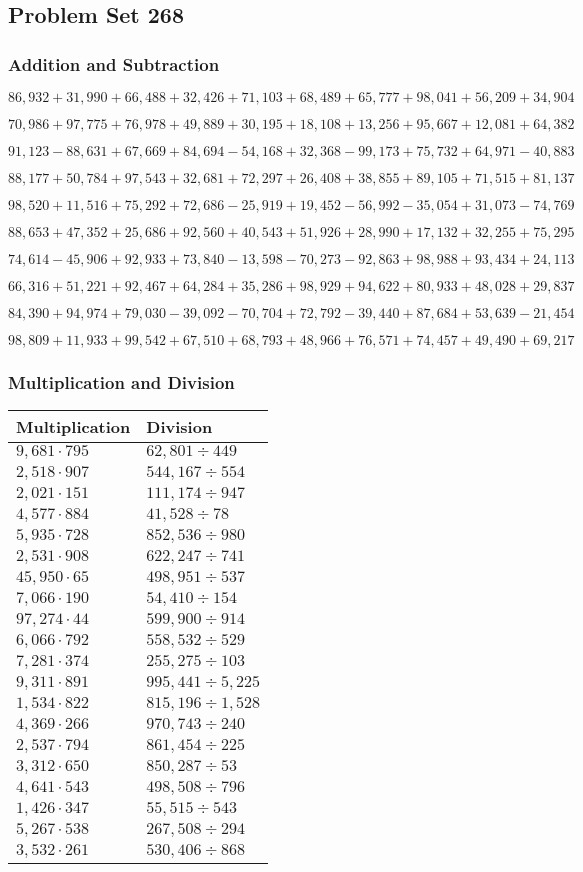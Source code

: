 \hypertarget{problem-set-268}{%
\subsection{Problem Set 268}\label{problem-set-268}}

\hypertarget{addition-and-subtraction}{%
\subsubsection{Addition and
Subtraction}\label{addition-and-subtraction}}

\(86,932+31,990+66,488+32,426+71,103+68,489+65,777+98,041+56,209+34,904\)

\(70,986+97,775+76,978+49,889+30,195+18,108+13,256+95,667+12,081+64,382\)

\(91,123-88,631+67,669+84,694-54,168+32,368-99,173+75,732+64,971-40,883\)

\(88,177+50,784+97,543+32,681+72,297+26,408+38,855+89,105+71,515+81,137\)

\(98,520+11,516+75,292+72,686-25,919+19,452-56,992-35,054+31,073-74,769\)

\(88,653+47,352+25,686+92,560+40,543+51,926+28,990+17,132+32,255+75,295\)

\(74,614-45,906+92,933+73,840-13,598-70,273-92,863+98,988+93,434+24,113\)

\(66,316+51,221+92,467+64,284+35,286+98,929+94,622+80,933+48,028+29,837\)

\(84,390+94,974+79,030-39,092-70,704+72,792-39,440+87,684+53,639-21,454\)

\(98,809+11,933+99,542+67,510+68,793+48,966+76,571+74,457+49,490+69,217\)

\hypertarget{multiplication-and-division}{%
\subsubsection{Multiplication and
Division}\label{multiplication-and-division}}

\begin{longtable}[]{@{}ll@{}}
\toprule
Multiplication & Division\tabularnewline
\midrule
\endhead
\(9,681\cdot795\) & \(62,801÷449\)\tabularnewline
\(2,518\cdot907\) & \(544,167÷554\)\tabularnewline
\(2,021\cdot151\) & \(111,174÷947\)\tabularnewline
\(4,577\cdot884\) & \(41,528÷78\)\tabularnewline
\(5,935\cdot728\) & \(852,536÷980\)\tabularnewline
\(2,531\cdot908\) & \(622,247÷741\)\tabularnewline
\(45,950\cdot65\) & \(498,951÷537\)\tabularnewline
\(7,066\cdot190\) & \(54,410÷154\)\tabularnewline
\(97,274\cdot44\) & \(599,900÷914\)\tabularnewline
\(6,066\cdot792\) & \(558,532÷529\)\tabularnewline
\(7,281\cdot374\) & \(255,275÷103\)\tabularnewline
\(9,311\cdot891\) & \(995,441÷5,225\)\tabularnewline
\(1,534\cdot822\) & \(815,196÷1,528\)\tabularnewline
\(4,369\cdot266\) & \(970,743÷240\)\tabularnewline
\(2,537\cdot794\) & \(861,454÷225\)\tabularnewline
\(3,312\cdot650\) & \(850,287÷53\)\tabularnewline
\(4,641\cdot543\) & \(498,508÷796\)\tabularnewline
\(1,426\cdot347\) & \(55,515÷543\)\tabularnewline
\(5,267\cdot538\) & \(267,508÷294\)\tabularnewline
\(3,532\cdot261\) & \(530,406÷868\)\tabularnewline
\bottomrule
\end{longtable}
